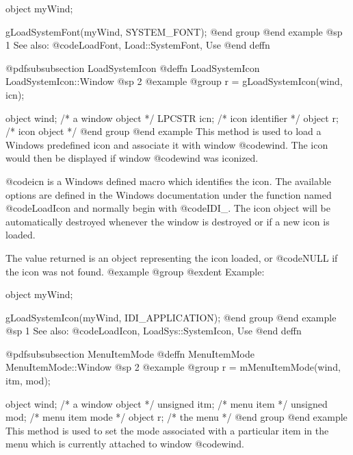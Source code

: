 object  myWind;

gLoadSystemFont(myWind, SYSTEM_FONT);
@end group
@end example
@sp 1
See also:  @code{LoadFont, Load::SystemFont, Use}
@end deffn
















@pdfsubsubsection {LoadSystemIcon}
@deffn {LoadSystemIcon} LoadSystemIcon::Window
@sp 2
@example
@group
r = gLoadSystemIcon(wind, icn);

object   wind;  /*  a window object  */
LPCSTR   icn;   /*  icon identifier  */
object   r;     /*  icon object      */
@end group
@end example
This method is used to load a Windows predefined icon and associate it
with window @code{wind}.  The icon would then be displayed if window
@code{wind} was iconized.

@code{icn} is a Windows defined macro which identifies the icon.  The
available options are defined in the Windows documentation under the
function named @code{LoadIcon} and normally begin with @code{IDI_}.  The
icon object will be automatically destroyed whenever the window is
destroyed or if a new icon is loaded.

The value returned is an object representing the icon loaded, or
@code{NULL} if the icon was not found.
@example
@group
@exdent Example:

object  myWind;

gLoadSystemIcon(myWind, IDI_APPLICATION);
@end group
@end example
@sp 1
See also:  @code{LoadIcon, LoadSys::SystemIcon, Use}
@end deffn














@pdfsubsubsection {MenuItemMode}
@deffn {MenuItemMode} MenuItemMode::Window
@sp 2
@example
@group
r = mMenuItemMode(wind, itm, mod);

object  wind;   /*  a window object     */
unsigned itm;   /*  menu item           */
unsigned mod;   /*  menu item mode      */
object   r;        /*  the menu         */
@end group
@end example
This method is used to set the mode associated with a particular item
in the menu which is currently attached to window @code{wind}.

